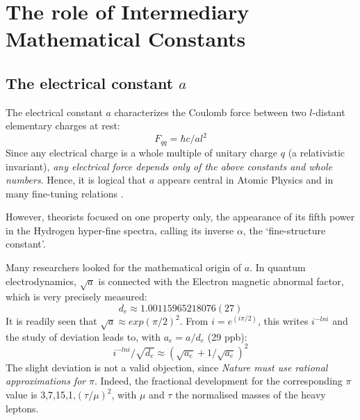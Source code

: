 \documentclass[twoside,draft]{article}
\begin{document}
\begin{sloppypar}
\section{The role of Intermediary Mathematical Constants}

\subsection{The electrical constant $a$}
The electrical constant $a$ characterizes the Coulomb force between two $l$-distant elementary charges at rest:
\begin{equation}
F_{qq} =\hbar c/al^{2}    
\end{equation}
Since any electrical charge is a whole multiple of unitary charge $q$ (a relativistic invariant), \textit{any electrical force depends only of the above constants and whole numbers}. Hence, it is logical that $a$ appears central in Atomic Physics and in many fine-tuning relations \cite{Carr}.

However, theorists focused on one property only, the appearance of its fifth power in the Hydrogen hyper-fine spectra, calling its inverse $\alpha$, the `fine-structure constant'. 

Many researchers looked for the mathematical origin of $a$. In quantum electrodynamics, $\sqrt{a}$ is connected with the Electron magnetic abnormal factor, which is very precisely measured\cite{Tanabashi}: $$d_e \approx 1.00115965218076(27)$$
It is readily seen that $\sqrt{a} \approx exp(\pi /2)^2$. From $i = e^{(i\pi /2)}$, this writes $i^{-lni}$ and the study of deviation leads to, with $a_e = a/d_e$ (29 ppb):
\begin{equation}
i^{-lni}/\sqrt{d_e} \approx (\sqrt{a_e} + 1/\sqrt{a_e})^2    
\end{equation}
The slight deviation is not a valid objection, since \textit{Nature must use rational approximations for} $\pi$. Indeed, the fractional development for the corresponding $\pi$ value is 3,7,15,1,$(\tau/\mu)^2$, with $\mu$ and $\tau$ the normalised masses of the heavy leptons.


\end{sloppypar}
\end{document}

